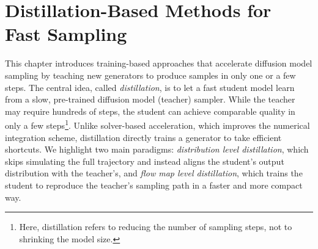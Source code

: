 % 



% 
\chapter{Distillation-Based Methods for Fast Sampling}\label{ch:distillation}

This chapter introduces training-based approaches that accelerate diffusion model sampling by teaching new generators to produce samples in only one or a few steps. The central idea, called \emph{distillation}, is to let a fast student model learn from a slow, pre-trained diffusion model (teacher) sampler. While the teacher may require hundreds of steps, the student can achieve comparable quality in only a few steps\footnote{Here, distillation refers to reducing the number of sampling steps, not to shrinking the model size.}. Unlike solver-based acceleration, which improves the numerical integration scheme, distillation directly trains a generator to take efficient shortcuts. We highlight two main paradigms: \emph{distribution level distillation}, which skips simulating the full trajectory and instead aligns the student’s output distribution with the teacher’s, and \emph{flow map level distillation}, which trains the student to reproduce the teacher’s sampling path in a faster and more compact way.





\clearpage
\newpage


